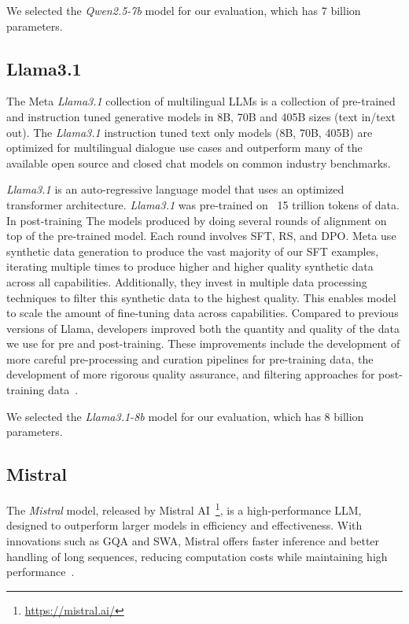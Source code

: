We selected the \textit{Qwen2.5-7b} model for our evaluation, which has 7 billion parameters.

\subsection{Llama3.1}\label{subsec:empirical-evaluation:candidate-models:llama3.1}
The Meta \textit{Llama3.1} collection of multilingual LLMs is a collection of pre-trained and instruction tuned generative models in 8B, 70B and 405B sizes (text in/text out).
The \textit{Llama3.1} instruction tuned text only models (8B, 70B, 405B) are optimized for multilingual dialogue use cases and outperform many of the available open source and closed chat models on common industry benchmarks.

\textit{Llama3.1} is an auto-regressive language model that uses an optimized transformer architecture.
\textit{Llama3.1} was pre-trained on ~15 trillion tokens of data.
In post-training The models produced by doing several rounds of alignment on top of the pre-trained model.
Each round involves \ac{SFT}, \ac{RS}, and \ac{DPO}.
Meta use synthetic data generation to produce the vast majority of our SFT examples, iterating multiple times to produce higher and higher quality synthetic data across all capabilities.
Additionally, they invest in multiple data processing techniques to filter this synthetic data to the highest quality.
This enables model to scale the amount of fine-tuning data across capabilities.
Compared to previous versions of Llama, developers improved both the quantity and quality of the data we use for pre and post-training.
These improvements include the development of more careful pre-processing and curation pipelines for pre-training data, the development of more rigorous quality assurance, and filtering approaches for post-training data~\cite{dubey2024llama3herdmodels,meta2023llama3}.

We selected the \textit{Llama3.1-8b} model for our evaluation, which has 8 billion parameters.

\subsection{Mistral}\label{subsec:empirical-evaluation:candidate-models:mistral}
The \textit{Mistral} model, released by Mistral AI~\footnote{\url{https://mistral.ai/}}, is a high-performance LLM, designed to outperform larger models in efficiency and effectiveness.
With innovations such as \ac{GQA} and \ac{SWA}, Mistral offers faster inference and better handling of long sequences, reducing computation costs while maintaining high performance~\cite{jiang2023mistral7b,mistral7b_2023}.

